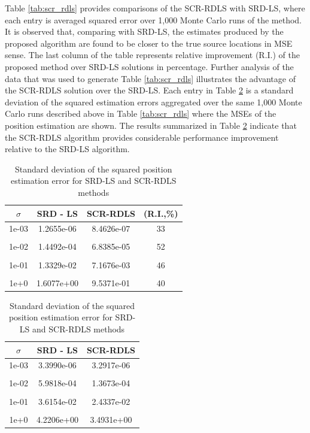Table \ref{tab:scr_rdls}  provides comparisons of the SCR-RDLS with SRD-LS, where each entry is averaged squared error over 1,000 Monte Carlo runs of the method. %
 It is observed that, comparing with SRD-LS, the estimates produced by the proposed algorithm are found to be closer to the true source locations in MSE sense. The last column of the table  represents relative improvement (R.I.) of the proposed method over SRD-LS solutions in percentage. Further analysis of the data that was used to generate Table \ref{tab:scr_rdls} illustrates the advantage of the SCR-RDLS solution over the SRD-LS. 
Each entry in Table \ref{tab:rdls} is a standard deviation of the squared  estimation errors  aggregated over the  same 1,000 Monte Carlo runs described above in Table \ref{tab:scr_rdls} where the MSEs of the position estimation are shown. The results summarized in Table \ref{tab:rdls} indicate that the SCR-RDLS algorithm provides considerable performance improvement relative to the SRD-LS algorithm.

\phantom{m}

\begin{table}[h]
\centering
\caption{MSE of position estimation for SRD-LS and SCR-RDLS methods}
\phantom{m}
\begin{tabular}{|c|c|c|c|} \hline
\centering
$\sigma$ & SRD - LS & SCR-RDLS & (R.I.,\%)  \\ \hline
1e-03&	1.2655e-06  & 8.4626e-07 &  33 \\ &&&\\
1e-02&	1.4492e-04 &  6.8385e-05 &  52 \\ &&&\\
1e-01&	1.3329e-02 & 7.1676e-03 &   46 \\ &&&\\
1e+0&	1.6077e+00 &  9.5371e-01 &   40  \\ %
\hline
\end{tabular}
\label{tab:scr_rdls}

\phantom{m}

\centering
\caption{Standard deviation of the squared position estimation error for SRD-LS and SCR-RDLS methods}
\phantom{m}
\begin{tabular}{|c|c|c|} \hline
$\sigma$ & SRD - LS & SCR-RDLS  \\ \hline
1e-03&	3.3990e-06 &  3.2917e-06 \\ &&\\
1e-02&	5.9818e-04 &   1.3673e-04 \\ &&\\
1e-01&	3.6154e-02  & 2.4337e-02 \\ &&\\
1e+0&	4.2206e+00 &  3.4931e+00 \\ %
\hline
\end{tabular}
\label{tab:rdls}
\end{table}

